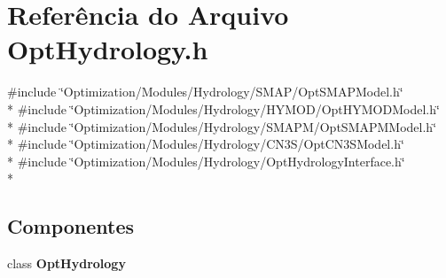 \section{Referência do Arquivo Opt\+Hydrology.\+h}
\label{_opt_hydrology_8h}
{\ttfamily \#include \char`\"{}Optimization/\+Modules/\+Hydrology/\+S\+M\+A\+P/\+Opt\+S\+M\+A\+P\+Model.\+h\char`\"{}}\\*
{\ttfamily \#include \char`\"{}Optimization/\+Modules/\+Hydrology/\+H\+Y\+M\+O\+D/\+Opt\+H\+Y\+M\+O\+D\+Model.\+h\char`\"{}}\\*
{\ttfamily \#include \char`\"{}Optimization/\+Modules/\+Hydrology/\+S\+M\+A\+P\+M/\+Opt\+S\+M\+A\+P\+M\+Model.\+h\char`\"{}}\\*
{\ttfamily \#include \char`\"{}Optimization/\+Modules/\+Hydrology/\+C\+N3\+S/\+Opt\+C\+N3\+S\+Model.\+h\char`\"{}}\\*
{\ttfamily \#include \char`\"{}Optimization/\+Modules/\+Hydrology/\+Opt\+Hydrology\+Interface.\+h\char`\"{}}\\*
\subsection*{Componentes}
\begin{DoxyCompactItemize}
\item 
class {\bf Opt\+Hydrology}
\end{DoxyCompactItemize}
